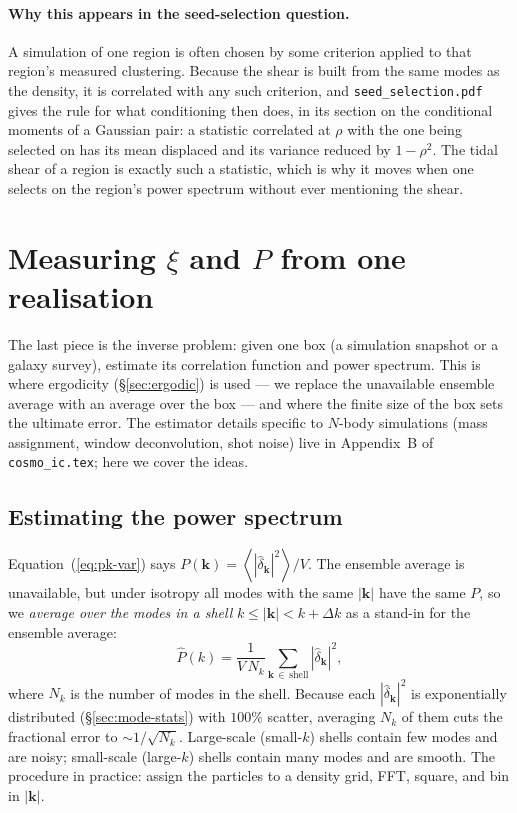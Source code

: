 \documentclass[12pt]{article}
\newcommand{\bk}{\mathbf{k}}
\newcommand{\avg}[1]{\left\langle #1 \right\rangle}
\newcommand{\code}[1]{\texttt{#1}}
\begin{document}
\paragraph{Why this appears in the seed-selection question.}  A
simulation of one region is often chosen by some criterion applied to
that region's measured clustering.  Because the shear is built from the
same modes as the density, it is correlated with any such criterion, and
\code{seed\_selection.pdf} gives the rule for what conditioning then
does, in its section on the conditional moments of a Gaussian pair: a statistic correlated at $\rho$ with the
one being selected on has its mean displaced and its variance reduced by
$1-\rho^2$.  The tidal shear of a region is exactly such a statistic,
which is why it moves when one selects on the region's power spectrum
without ever mentioning the shear.

\section{Measuring $\xi$ and $P$ from one realisation}
\label{sec:estimate}

The last piece is the inverse problem: given one box (a simulation
snapshot or a galaxy survey), estimate its correlation function and power
spectrum.  This is where ergodicity (\S\ref{sec:ergodic}) is used
--- we replace the unavailable ensemble average with an average over the
box --- and where the finite size of the box sets the ultimate error.
The estimator details specific to $N$-body simulations (mass assignment,
window deconvolution, shot noise) live in Appendix~B of
\code{cosmo\_ic.tex}; here we cover the ideas.

\subsection{Estimating the power spectrum}
\label{sec:estimate-pk}

Equation~(\ref{eq:pk-var}) says $P(\bk) = \avg{|\hat\delta_\bk|^2}/V$.
The ensemble average is unavailable, but under isotropy all modes with
the same $|\bk|$ have the same $P$, so we \emph{average over the modes in
a shell} $k \le |\bk| < k + \Delta k$ as a stand-in for the ensemble
average:
\begin{equation}
  \hat P(k) = \frac{1}{V\,N_k}\sum_{\bk\,\in\,\text{shell}} |\hat\delta_\bk|^2,
  \label{eq:pk-estimator}
\end{equation}
where $N_k$ is the number of modes in the shell.  Because each
$|\hat\delta_\bk|^2$ is exponentially distributed
(\S\ref{sec:mode-stats}) with $100\%$ scatter, averaging $N_k$ of them
cuts the fractional error to $\sim 1/\sqrt{N_k}$.  Large-scale (small-$k$)
shells contain few modes and are noisy; small-scale (large-$k$) shells
contain many modes and are smooth.  The procedure in practice: assign the
particles to a density grid, FFT, square, and bin in $|\bk|$.
\end{document}
